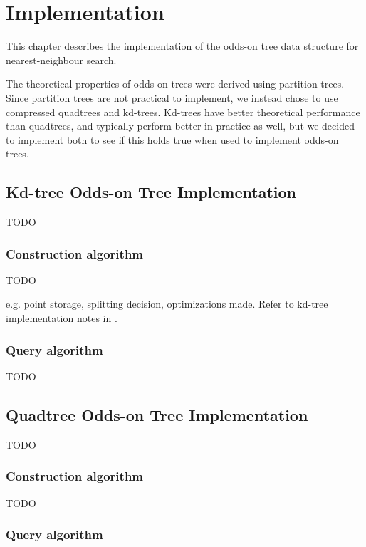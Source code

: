 \documentclass[mcs]{scsthesis}
\begin{document}
\chapter{Implementation}

This chapter describes the implementation of the odds-on tree data structure
for nearest-neighbour search.

The theoretical properties of odds-on trees were derived using partition trees.
Since partition trees are not practical to implement, we instead chose to use
compressed quadtrees and kd-trees. Kd-trees have better theoretical performance
than quadtrees, and typically perform better in practice as well, but we
decided to implement both to see if this holds true when used to implement
odds-on trees.

\section{Kd-tree Odds-on Tree Implementation}

TODO

\subsection{Construction algorithm}

TODO

e.g. point storage, splitting decision, optimizations made. Refer to 
kd-tree implementation notes in \cite{physicallybasedrendering}.

\subsection{Query algorithm}

TODO

\section{Quadtree Odds-on Tree Implementation}

TODO

\subsection{Construction algorithm}

TODO

\subsection{Query algorithm}
\end{document}
